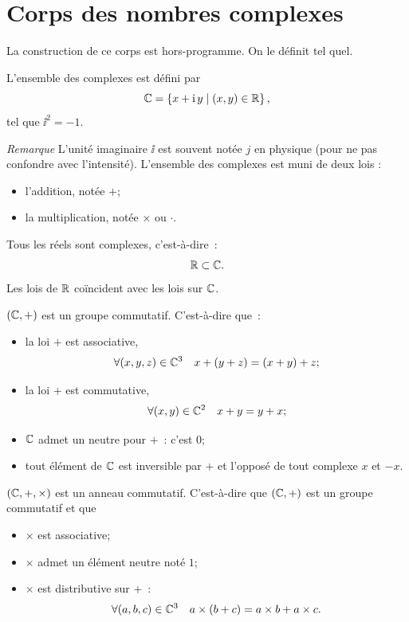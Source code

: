 \section{Corps des nombres complexes}
\label{sec:corpsdescomplexes}
La construction de ce corps est hors-programme. On le définit tel quel.
\begin{defdef}
  L'ensemble des complexes est défini par
  \begin{equation}
    \mathbb{C} = \left\{x+ \operatorname{i} y\mathrel{}\middle|\mathrel{}(x,y)\in \mathbb{R}\right\},
  \end{equation}
  tel que $\ii^2=-1$.
\end{defdef}
\emph{Remarque} L'unité imaginaire $\ii$ est souvent notée $j$ en physique (pour ne pas confondre avec l'intensité). L'ensemble des complexes est muni de deux lois :
\begin{itemize}
\item l'addition, notée $+$;
\item la multiplication, notée $\times$ ou $\cdot$.
\end{itemize}
%
\begin{prop} Tous les réels sont complexes, c'est-à-dire~:
  \begin{equation}
    \mathbb{R} \subset \mathbb{C}.
  \end{equation}
  Les lois de $\mathbb{R}$ coïncident avec les lois sur $\mathbb{C}$.
\end{prop}
%
\begin{prop}
  $(\mathbb{C},+)$ est un groupe commutatif. C'est-à-dire que~:
  \begin{itemize}
  \item la loi $+$ est associative,
    \begin{equation}
      \forall (x,y,z) \in \mathbb{C}^3 \quad x+(y+z)=(x+y)+z;
    \end{equation}
  \item la loi $+$ est commutative,
    \begin{equation}
      \forall (x,y) \in \mathbb{C}^2 \quad x+y=y+x;
    \end{equation}
  \item $\mathbb{C}$ admet un neutre pour $+$~: c'est $0$;
  \item tout élément de $\mathbb{C}$ est inversible par $+$ et l'opposé de tout complexe $x$ et $-x$.
  \end{itemize}
\end{prop}
%
\begin{prop}
  $(\mathbb{C},+,\times)$ est un anneau commutatif. C'est-à-dire que $(\mathbb{C},+)$ est un groupe commutatif et que
  \begin{itemize}
  \item $\times$ est associative;
  \item $\times$ admet un élément neutre noté $1$;
  \item $\times$ est distributive sur $+$~:
    \begin{equation}
      \forall (a,b,c) \in \mathbb{C}^3 \quad a \times (b+c)=a \times b+ a \times c.
    \end{equation}
\end{itemize}
\end{prop}
